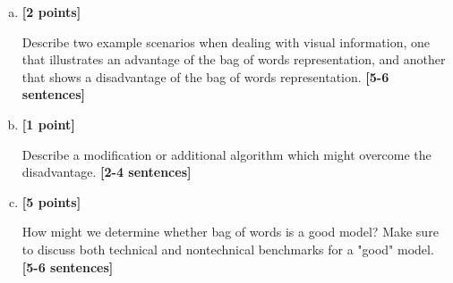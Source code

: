 \begin{enumerate}[(a)]

\item \textbf{[2 points]} 
\begin{tcolorbox}[colback=orange!5!white,colframe=orange!75!black]
     Describe two example scenarios when dealing with visual information, one that illustrates an advantage of the bag of words representation, and another that shows a disadvantage of the bag of words representation. \textbf{[5-6 sentences]}
\end{tcolorbox}


\item \textbf{[1 point]}
\begin{tcolorbox}[colback=orange!5!white,colframe=orange!75!black]
      Describe a modification or additional algorithm which might overcome the disadvantage. \textbf{[2-4 sentences]}
\end{tcolorbox}


\item \textbf{[5 points]} 
\begin{tcolorbox}[colback=orange!5!white,colframe=orange!75!black]
     How might we determine whether bag of words is a good model? Make sure to discuss both technical and nontechnical benchmarks for a "good" model. \textbf{[5-6 sentences]}
\end{tcolorbox}


\end{enumerate}

